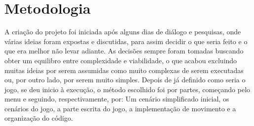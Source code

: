 \documentclass[journal]{IEEEtran}
\begin{document}
\section{Metodologia}
A criação do projeto foi iniciada após alguns dias de diálogo e pesquisas, onde várias ideias foram expostas e discutidas, para assim decidir o que seria feito e o que era melhor não levar adiante.
As decisões sempre foram tomadas buscando obter um equilibro entre complexidade e viabilidade, o que acabou excluindo muitas ideias por serem assumidas como muito complexas de serem executadas ou, por outro lado, por serem muito simples.
Depois de já definido como seria o jogo, se deu inicio à execução, o método escolhido foi por partes, começando pelo menu e seguindo, respectivamente, por: Um cenário simplificado inicial, os cenários do jogo, a parte escrita do jogo, a implementação de movimento e a organização do código.


\end{document}
